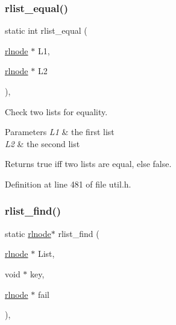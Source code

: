 \subsubsection{\texorpdfstring{rlist\+\_\+equal()}{rlist\_equal()}}
{\footnotesize\ttfamily static int rlist\+\_\+equal (\begin{DoxyParamCaption}\item[{\hyperlink{group__rlists_ga8f6244877f7ce2322c90525217ea6e7a}{rlnode} $\ast$}]{L1,  }\item[{\hyperlink{group__rlists_ga8f6244877f7ce2322c90525217ea6e7a}{rlnode} $\ast$}]{L2 }\end{DoxyParamCaption})\hspace{0.3cm}{\ttfamily [inline]}, {\ttfamily [static]}}



Check two lists for equality. 


\begin{DoxyParams}{Parameters}
{\em L1} & the first list \\
\hline
{\em L2} & the second list \\
\hline
\end{DoxyParams}
\begin{DoxyReturn}{Returns}
true iff two lists are equal, else false. 
\end{DoxyReturn}


Definition at line 481 of file util.\+h.

\mbox{\label{group__rlists_gafbb3a5edeac9f1d43130528292c47cf6}} 
\subsubsection{\texorpdfstring{rlist\+\_\+find()}{rlist\_find()}}
{\footnotesize\ttfamily static \hyperlink{group__rlists_ga8f6244877f7ce2322c90525217ea6e7a}{rlnode}$\ast$ rlist\+\_\+find (\begin{DoxyParamCaption}\item[{\hyperlink{group__rlists_ga8f6244877f7ce2322c90525217ea6e7a}{rlnode} $\ast$}]{List,  }\item[{void $\ast$}]{key,  }\item[{\hyperlink{group__rlists_ga8f6244877f7ce2322c90525217ea6e7a}{rlnode} $\ast$}]{fail }\end{DoxyParamCaption})\hspace{0.3cm}{\ttfamily [inline]}, {\ttfamily [static]}}



